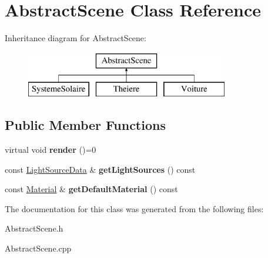\hypertarget{classAbstractScene}{}\section{Abstract\+Scene Class Reference}
\label{classAbstractScene}
Inheritance diagram for Abstract\+Scene\+:\begin{figure}[H]
\begin{center}
\leavevmode
\includegraphics[height=2.000000cm]{classAbstractScene}
\end{center}
\end{figure}
\subsection*{Public Member Functions}
\begin{DoxyCompactItemize}
\item 
\mbox{\label{classAbstractScene_ae4f545c8335b65b42a6198ee09bf8084}} 
virtual void {\bfseries render} ()=0
\item 
\mbox{\label{classAbstractScene_a9ed3a55a71f913f90f67c084c4f69139}} 
const \mbox{\hyperlink{classLightSourceData}{Light\+Source\+Data}} \& {\bfseries get\+Light\+Sources} () const
\item 
\mbox{\label{classAbstractScene_a8ece71b28eccbe993adeca2f25540bb6}} 
const \mbox{\hyperlink{classMaterial}{Material}} \& {\bfseries get\+Default\+Material} () const
\end{DoxyCompactItemize}


The documentation for this class was generated from the following files\+:\begin{DoxyCompactItemize}
\item 
Abstract\+Scene.\+h\item 
Abstract\+Scene.\+cpp\end{DoxyCompactItemize}
